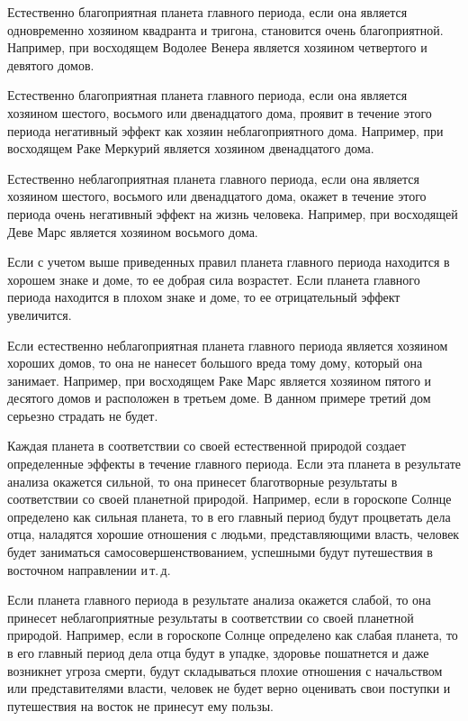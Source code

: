 Естественно благоприятная планета главного периода, если она является одновременно хозяином квадранта и тригона, становится очень благоприятной. Например, при восходящем Водолее Венера является хозяином четвертого и девятого домов.

Естественно благоприятная планета главного периода, если она является хозяином шестого, восьмого или двенадцатого дома, проявит в течение этого периода негативный эффект как хозяин неблагоприятного дома. Например, при восходящем Раке Меркурий является хозяином двенадцатого дома.

Естественно неблагоприятная планета главного периода, если она является хозяином шестого, восьмого или двенадцатого дома, окажет в течение этого периода очень негативный эффект на жизнь человека. Например, при восходящей Деве Марс является хозяином восьмого дома.

Если с учетом выше приведенных правил планета главного периода находится в хорошем знаке и доме, то ее добрая сила возрастет. Если планета главного периода находится в плохом знаке и доме, то ее отрицательный эффект увеличится.

Если естественно неблагоприятная планета главного периода является хозяином хороших домов, то она не нанесет большого вреда тому дому, который она занимает. Например, при восходящем Раке Марс является хозяином пятого и десятого домов и расположен в третьем доме. В данном примере третий дом серьезно страдать не будет.

Каждая планета в соответствии со своей естественной природой создает определенные эффекты в течение главного периода. Если эта планета в результате анализа окажется сильной, то она принесет благотворные результаты в соответствии со своей планетной природой. Например, если в гороскопе Солнце определено как сильная планета, то в его главный период будут процветать дела отца, наладятся хорошие отношения с людьми, представляющими власть, человек будет заниматься самосовершенствованием, успешными будут путешествия в восточном направлении и\,т.\,д.

Если планета главного периода в результате анализа окажется слабой, то она принесет неблагоприятные результаты в соответствии со своей планетной природой. Например, если в гороскопе Солнце определено как слабая планета, то в его главный период дела отца будут в упадке, здоровье пошатнется и даже возникнет угроза смерти, будут складываться плохие отношения с начальством или представителями власти, человек не будет верно оценивать свои поступки и путешествия на восток не принесут ему пользы.


